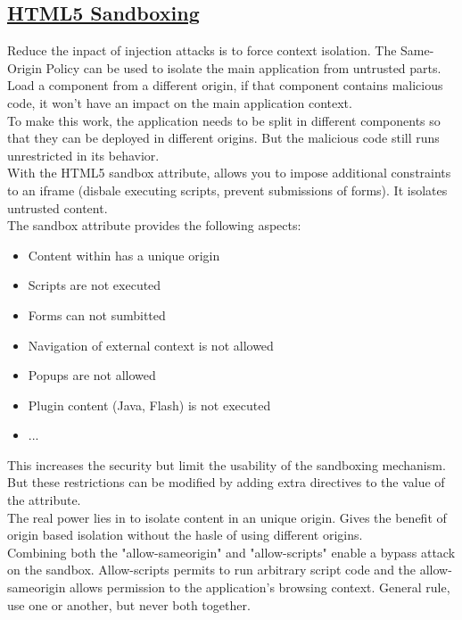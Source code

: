 \documentclass[titlepage]{article}
\begin{document}
    \subsection{\href{https://youtu.be/X_YArDr4nxU}{HTML5 Sandboxing}}
    Reduce the inpact of injection attacks is to force context isolation. The Same-Origin Policy can be used to isolate the main application from untrusted parts. Load a component from a different origin, if that component contains malicious code, it won't have an impact on the main application context.\\
    To make this work, the application needs to be split in different components so that they can be deployed in different origins. But the malicious code still runs unrestricted in its behavior.\\
    With the HTML5 sandbox attribute, allows you to impose additional constraints to an iframe (disbale executing scripts, prevent submissions of forms). It isolates untrusted content.\\
    The sandbox attribute provides the following aspects:
    \begin{itemize}
        \item Content within has a unique origin
        \item Scripts are not executed
        \item Forms can not sumbitted
        \item Navigation of external context is not allowed
        \item Popups are not allowed
        \item Plugin content (Java, Flash) is not executed
        \item ...
    \end{itemize}
    This increases the security but limit the usability of the sandboxing mechanism. But these restrictions can be modified by adding extra directives to the value of the attribute.\\
    The real power lies in to isolate content in an unique origin. Gives the benefit of origin based isolation without the hasle of using different origins.\\
    Combining both the "allow-sameorigin" and "allow-scripts" enable a bypass attack on the sandbox. Allow-scripts permits to run arbitrary script code and the allow-sameorigin allows permission to the application's browsing context. General rule, use one or another, but never both together.
\end{document}
